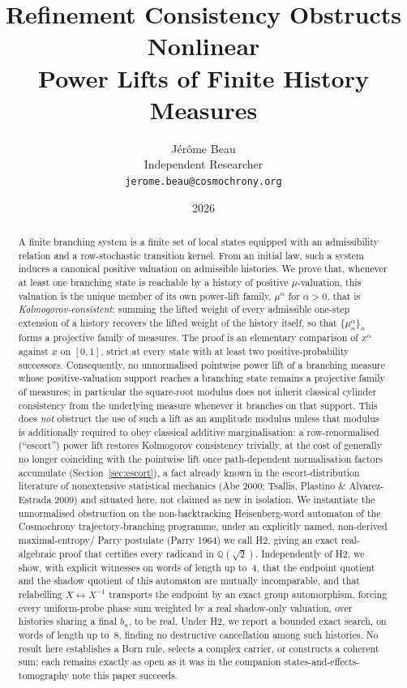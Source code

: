 \documentclass[11pt,a4paper]{article}
\title{\textbf{Refinement Consistency Obstructs Nonlinear}\\
\textbf{Power Lifts of Finite History Measures}}
\author{J\'er\^ome Beau\\[0.3em]
\small Independent Researcher\\
\small \texttt{jerome.beau@cosmochrony.org}}
\date{2026}
\theoremstyle{definition}
\theoremstyle{remark}
\newcommand{\Q}{\mathbb{Q}}
\newcommand{\Qroot}{\Q(\sqrt{2})}
\begin{document}
\maketitle

\begin{abstract}
A finite branching system is a finite set of local states equipped with an admissibility
relation and a row-stochastic transition kernel. From an initial law, such a system
induces a canonical positive valuation on admissible histories. We prove that, whenever
at least one branching state is reachable by a history of positive $\mu$-valuation, this
valuation is the unique member of its own power-lift family, $\mu^\alpha$ for
$\alpha>0$, that is \emph{Kolmogorov-consistent}: summing the lifted weight of every
admissible one-step extension of a history recovers the lifted weight of the history
itself, so that $\{\mu_n^\alpha\}_n$ forms a projective family of measures. The proof is
an elementary comparison of $x^\alpha$ against $x$ on $[0,1]$, strict at every state with
at least two positive-probability successors. Consequently, no unnormalised pointwise
power lift of a branching measure whose positive-valuation support reaches a branching
state remains a projective family of measures; in particular the square-root modulus
does not inherit classical cylinder consistency from the underlying measure whenever it
branches on that support. This does \emph{not} obstruct the use of such a lift as an
amplitude modulus unless that modulus is additionally required to obey classical
additive
marginalisation: a row-renormalised (``escort'') power lift restores Kolmogorov
consistency trivially, at the cost of generally no longer coinciding with the pointwise
lift once path-dependent normalisation factors accumulate
(Section~\ref{sec:escort}), a fact already known in the escort-distribution literature of
nonextensive statistical mechanics (Abe 2000; Tsallis, Plastino \& Alvarez-Estrada 2009)
and situated here, not claimed as new in isolation. We instantiate the unnormalised
obstruction on the non-backtracking Heisenberg-word automaton of the Cosmochrony
trajectory-branching programme, under an explicitly named, non-derived maximal-entropy/
Parry postulate (Parry 1964) we call \textup{H2}, giving an exact real-algebraic proof
that certifies every radicand in $\Qroot$. Independently of \textup{H2}, we show, with
explicit witnesses on words of length up to~$4$, that the endpoint quotient and the
shadow quotient of this automaton are mutually incomparable, and that relabelling
$X\leftrightarrow X^{-1}$ transports the endpoint by an exact group automorphism,
forcing every uniform-probe phase sum weighted by a real shadow-only valuation, over
histories sharing a final $b_n$, to be real. Under \textup{H2}, we report a bounded
exact search, on words of length up to~$8$, finding no destructive cancellation among
such histories. No result here establishes a Born rule, selects a complex carrier, or
constructs a coherent sum; each remains exactly as open as it was in the companion
states-and-effects-tomography note this paper succeeds.


\end{abstract}
\end{document}

